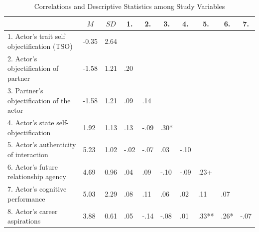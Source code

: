 \documentclass[man]{apa6}
\begin{document}
\begin{table}[tbp]
\begin{center}
\begin{threeparttable}
\caption{\label{tab:corrtable}Correlations and Descriptive Statistics among Study Variables}
\begin{tabular}{llllllllll}
\toprule
 & \multicolumn{1}{c}{$M$} & \multicolumn{1}{c}{$SD$} & \multicolumn{1}{c}{1.} & \multicolumn{1}{c}{2.} & \multicolumn{1}{c}{3.} & \multicolumn{1}{c}{4.} & \multicolumn{1}{c}{5.} & \multicolumn{1}{c}{6.} & \multicolumn{1}{c}{7.}\\
\midrule
1. Actor's trait self objectification (TSO) & -0.35 & 2.64 &  &  &  &  &  &  & \\
2. Actor's objectification of partner & -1.58 & 1.21 & .20 &  &  &  &  &  & \\
3. Partner's objectification of the actor & -1.58 & 1.21 & .09 & .14 &  &  &  &  & \\
4. Actor's state self-objectification & 1.92 & 1.13 & .13 & -.09 & .30* &  &  &  & \\
5. Actor's authenticity of interaction & 5.23 & 1.02 & -.02 & -.07 & .03 & -.10 &  &  & \\
6. Actor's future relationship agency & 4.69 & 0.96 & .04 & .09 & -.10 & -.09 & .23+ &  & \\
7. Actor's cognitive performance & 5.03 & 2.29 & .08 & .11 & .06 & .02 & .11 & .07 & \\
8. Actor's career aspirations & 3.88 & 0.61 & .05 & -.14 & -.08 & .01 & .33** & .26* & -.07\\
\bottomrule
\end{tabular}
\end{threeparttable}
\end{center}
\end{table}
\end{document}
